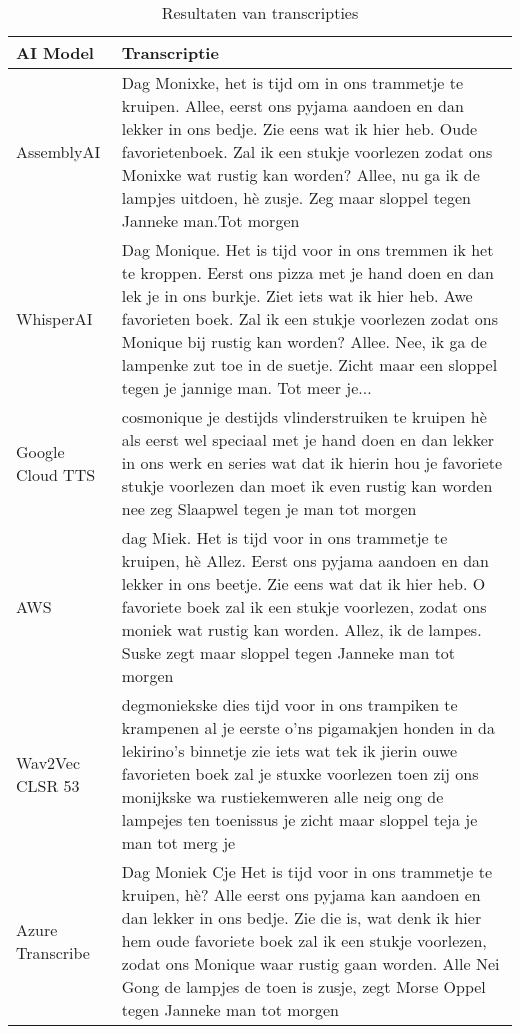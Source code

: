 \begin{table}[htbp]
    \centering
    \label{tab:results_sample1}
    \begin{tabularx}{\textwidth}{|l|X|}
        \hline
        \textbf{AI Model} & \textbf{Transcriptie} \\ \midrule

        AssemblyAI &    Dag Monixke, het is tijd om in ons trammetje te kruipen. Allee, eerst ons pyjama aandoen en dan lekker in ons bedje. Zie eens wat ik hier heb. Oude favorietenboek. Zal ik een stukje voorlezen zodat ons Monixke wat rustig kan worden? Allee, nu ga ik de lampjes uitdoen, hè zusje. Zeg maar sloppel tegen Janneke man.Tot morgen\\
        \hline
        
        WhisperAI & Dag Monique. Het is tijd voor in ons tremmen ik het te kroppen. Eerst ons pizza met je hand doen en dan lek je in ons burkje. Ziet iets wat ik hier heb. Awe favorieten boek. Zal ik een stukje voorlezen zodat ons Monique bij rustig kan worden? Allee. Nee, ik ga de lampenke zut toe in de suetje. Zicht maar een sloppel tegen je jannige man. Tot meer je...\\
        \hline
        
        Google Cloud TTS &         cosmonique je destijds vlinderstruiken te kruipen hè als eerst wel speciaal met je hand doen en dan lekker in ons werk en series wat dat ik hierin hou je favoriete stukje voorlezen dan moet ik even rustig kan worden nee zeg Slaapwel tegen je man tot morgen
         \\ \hline
        
        AWS &    dag Miek. Het is tijd voor in ons trammetje te kruipen, hè Allez. Eerst ons pyjama aandoen en dan lekker in ons beetje. Zie eens wat dat ik hier heb. O favoriete boek zal ik een stukje voorlezen, zodat ons moniek wat rustig kan worden. Allez, ik de lampes. Suske zegt maar sloppel tegen Janneke man tot morgen
         \\ \hline
        
       Wav2Vec CLSR 53 &     degmoniekske dies tijd voor in ons trampiken te krampenen al je eerste o'ns pigamakjen honden in da lekirino's binnetje zie iets wat tek ik jierin ouwe favorieten boek zal je stuxke voorlezen toen zij ons monijkske wa rustiekemweren alle neig ong de lampejes ten toenissus je zicht maar sloppel teja je man tot merg je
         \\ \hline
        
        Azure Transcribe & Dag Moniek Cje Het is tijd voor in ons trammetje te kruipen, hè? Alle eerst ons pyjama kan aandoen en dan lekker in ons bedje. Zie die is, wat denk ik hier hem oude favoriete boek zal ik een stukje voorlezen, zodat ons Monique waar rustig gaan worden. Alle Nei Gong de lampjes de toen is zusje, zegt Morse Oppel tegen Janneke man tot morgen
         \\ \hline
    \end{tabularx}
    \caption{Resultaten van transcripties}
\end{table}
\FloatBarrier
